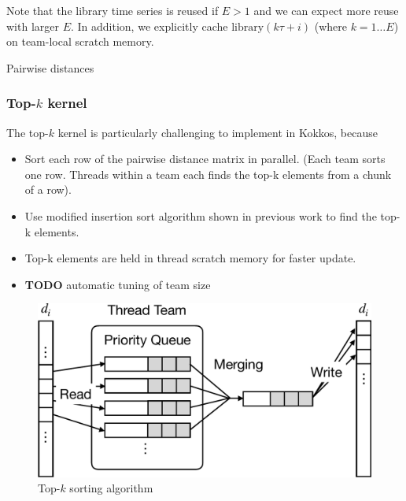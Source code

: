 \documentclass[conference]{IEEEtran}
\begin{document}
Note that the library time series is reused if $E > 1$ and we can expect
more reuse with larger $E$. In addition, we explicitly cache $\mathrm{library}
(k \tau + i)$ (where $k=1 \dots E$) on team-local scratch memory.

\begin{algorithm}
    \SetAlgoLined
    \DontPrintSemicolon
    \caption{Pairwise distances}%
    \label{alg:distances}
\end{algorithm}

\subsubsection{Top-$k$ kernel}

The top-$k$ kernel is particularly challenging to implement in Kokkos, because

\begin{itemize}
\item Sort each row of the pairwise distance matrix in parallel. (Each team sorts one row. Threads within a team each finds the top-k elements from a chunk of a row).
\item Use modified insertion sort algorithm shown in previous work to find the top-k elements.
\item Top-k elements are held in thread scratch memory for faster update.
\item \textbf{TODO} automatic tuning of team size
\end{itemize}

\begin{figure}
    \centering
    \includegraphics[width=.8\columnwidth]{figs/sorting}
    \caption{Top-$k$ sorting algorithm}%
    \label{fig:topk}
\end{figure}
\end{document}
